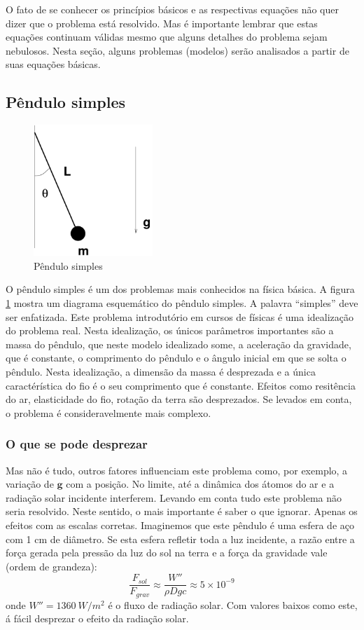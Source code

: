 \documentclass[article,12pt,oneside,a4paper,english,brazil,sumario=tradicional]{abntex2}
\begin{document}
O fato de se conhecer os princípios básicos e as respectivas equações não quer dizer que o problema está resolvido. Mas é importante lembrar que estas equações continuam válidas mesmo que alguns detalhes do problema sejam nebulosos. Nesta seção, alguns problemas (modelos) serão analisados a partir de suas equações básicas.

\subsection{Pêndulo simples}

\begin{figure}
\centering
\includegraphics[width=0.4\textwidth]{./figuras/pendulo.pdf}
\vspace{0.5cm}
\caption{Pêndulo simples}
\label{fig:pendulo}
\end{figure}

O pêndulo simples é um dos problemas mais conhecidos na física básica. A figura \ref{fig:pendulo} mostra um diagrama esquemático do pêndulo simples. A palavra ``simples'' deve ser enfatizada. Este problema introdutório em cursos de físicas é uma idealização do problema real. Nesta idealização, os únicos parâmetros importantes são a massa do pêndulo, que neste modelo idealizado some, a aceleração da gravidade, que é constante, o comprimento do pêndulo e o ângulo inicial em que se solta o pêndulo. Nesta idealização, a dimensão da massa é desprezada e a única caractérística do fio é o seu comprimento que é constante. Efeitos como resitência do ar, elasticidade do fio, rotação da terra são desprezados. Se levados em conta, o problema é consideravelmente mais complexo. 

\subsubsection{O que se pode desprezar}
Mas não é tudo, outros fatores influenciam este problema como, por exemplo, a variação de $\textbf{g}$ com a posição. No limite, até a dinâmica dos átomos do ar e a radiação solar incidente interferem. Levando em conta tudo este problema não seria resolvido. Neste sentido, o mais importante é saber o que ignorar. Apenas os efeitos com as escalas corretas. Imaginemos que este pêndulo é uma esfera de aço com 1 cm de diâmetro. Se esta esfera refletir toda a luz incidente, a razão entre a força gerada pela pressão da luz do sol na terra e a força da gravidade vale (ordem de grandeza):
\[
\frac{F_{sol}}{F_{grav}} \approx \frac{W''}{\rho D g c} \approx 5\times 10^{-9}
\]
onde $W''=1360\:W/m^2$ é o fluxo de radiação solar. Com valores baixos como este, á fácil desprezar o efeito da radiação solar. 
\end{document}
